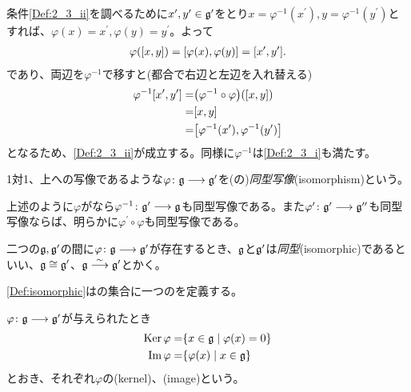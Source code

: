 \documentclass[../main]{subfiles}
\begin{document}
\begin{Proof}
  条件\ref{Def:2_3_ii}を調べるために$x^{\prime},y^{\prime}\in\mathfrak{g}^{\prime}$をとり$x=\varphi^{-1}(x^{\prime}),y=\varphi^{-1}(y^{\prime})$とすれば、$\varphi(x)=x^{\prime},\varphi(y)=y^{\prime}$。よって
  \begin{align*}
    \varphi\qty(\comm{x}{y})=\comm{\varphi(x)}{\varphi(y)}=\comm{x^{\prime}}{y^{\prime}}.
  \end{align*}
  であり、両辺を$\varphi^{-1}$で移すと(都合で右辺と左辺を入れ替える)
  \begin{align*}
    \varphi^{-1}\comm{x^{\prime}}{y^{\prime}} =& \qty(\varphi^{-1}\circ\varphi)\qty(\comm{x}{y}) \\
    =& \comm{x}{y} \\
    =& \comm{\varphi^{-1}(x^{\prime})}{\varphi^{-1}(y^{\prime})}
  \end{align*}
  となるため、\ref{Def:2_3_ii}が成立する。同様に$\varphi^{-1}$は\ref{Def:2_3_i}も満たす。
\end{Proof}

\begin{named}
  1対1、上への写像であるような{}$\varphi\colon\mathfrak{g}\longrightarrow\mathfrak{g}^{\prime}$を({}の)\emph{同型写像}(isomorphism)という。
\end{named}

\begin{remark}
  上述のように$\varphi$がなら$\varphi^{-1}\colon\mathfrak{g}^{\prime}\longrightarrow\mathfrak{g}$も同型写像である。また$\varphi^{\prime}\colon\mathfrak{g}^{\prime}\longrightarrow\mathfrak{g}^{{\prime\prime}}$も同型写像ならば、明らかに$\varphi^{\prime}\circ\varphi$も同型写像である。
\end{remark}

\begin{definition}[リー環の同型]\label{Def:isomorphic}
  二つの{}$\mathfrak{g},\mathfrak{g}^{\prime}$の間に$\varphi\colon\mathfrak{g}\longrightarrow\mathfrak{g}^{\prime}$が存在するとき、$\mathfrak{g}$と$\mathfrak{g}^{\prime}$は\emph{同型}(isomorphic)であるといい、$\mathfrak{g}\cong\mathfrak{g}^{\prime}$、$\mathfrak{g} \stackrel{\sim}{\longrightarrow}\mathfrak{g}^{\prime}$とかく。
\end{definition}

\begin{remark}
  \cref{Def:isomorphic}は{}の集合に一つの{}を定義する。
\end{remark}

\begin{definition}[核と像]\label{Def:ker_im}
  {}$\varphi\colon\mathfrak{g}\longrightarrow\mathfrak{g}^{\prime}$が与えられたとき
  \begin{align*}
    \operatorname{Ker}\varphi =& \qty{x\in\mathfrak{g}\mid\varphi(x)=0} \\
    \Im\varphi =& \qty{\varphi(x)\mid x\in\mathfrak{g}}
  \end{align*}
  とおき、それぞれ$\varphi$の(kernel)、(image)という。
\end{definition}
\end{document}
